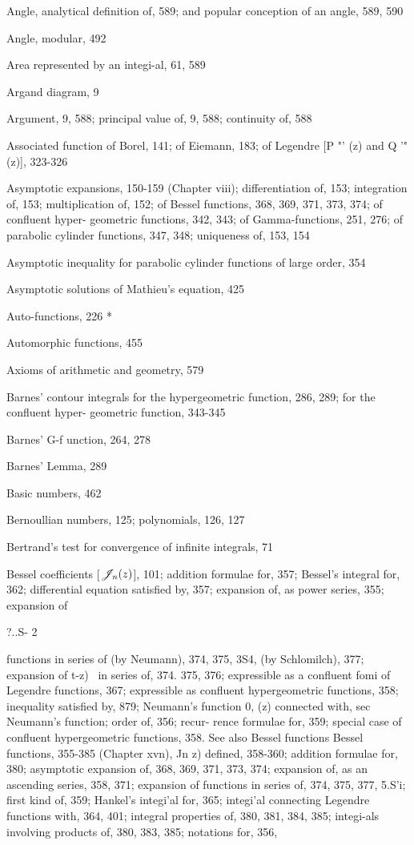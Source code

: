 Angle, analytical definition of, 589; and popular conception of an angle, 589, 590

Angle, modular, 492

Area represented by an integi-al, 61, 589

Argand diagram, 9

Argument, 9, 588; principal value of, 9, 588; continuity of, 588

Associated function of Borel, 141; of Eiemann, 183; of Legendre [P "' (z) and Q '" (z)], 323-326

Asymptotic expansions, 150-159 (Chapter viii); differentiation of, 153; integration of, 153;
multiplication of, 152; of Bessel functions, 368, 369, 371, 373, 374; of confluent hyper-
geometric functions, 342, 343; of Gamma-functions, 251, 276; of parabolic cylinder functions,
347, 348; uniqueness of, 153, 154

Asymptotic inequality for parabolic cylinder functions of large order, 354

Asymptotic solutions of Mathieu's equation, 425

Auto-functions, 226 *

Automorphic functions, 455

Axioms of arithmetic and geometry, 579

Barnes' contour integrals for the hypergeometric function, 286, 289; for the confluent hyper-
geometric function, 343-345

Barnes' G-f unction, 264, 278

Barnes' Lemma, 289

Basic numbers, 462

Bernoullian numbers, 125; polynomials, 126, 127

Bertrand's test for convergence of infinite integrals, 71

Bessel coefficients [$\mathscr{J}_{n}(z)$], 101; addition formulae for, 357; Bessel's integral for, 362;
differential equation satisfied by, 357; expansion of, as power series, 355; expansion of

?..S- 2

%
%
functions in series of (by Neumann), 374, 375, 3S4, (by Schlomilch), 377; expansion of
 t-z)~  in series of, 374. 375, 376; expressible as a confluent fomi of Legendre functions,
367; expressible as confluent hypergeometric functions, 358; inequality satisfied by, 879;
Neumann's function 0, (z) connected with, sec Neumann's function; order of, 356; recur-
rence formulae for, 359; special case of confluent hypergeometric functions, 358. See also
Bessel functions
Bessel functions, 355-385 (Chapter xvn), Jn z) defined, 358-360; addition formulae for, 380;
asymptotic expansion of, 368, 369, 371, 373, 374; expansion of, as an ascending series, 358,
371; expansion of functions in series of, 374, 375, 377, 5.S'i; first kind of, 359; Hankel's
integi'al for, 365; integi'al connecting Legendre functions with, 364, 401; integral properties
of, 380, 381, 384, 385; integi-als involving products of, 380, 383, 385; notations for, 356,

